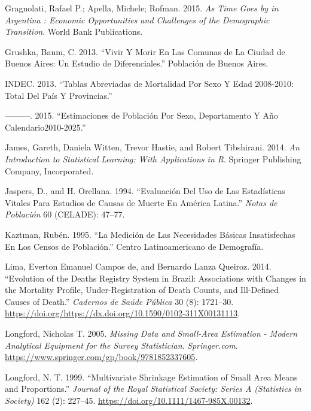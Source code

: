 \documentclass[12pt,]{article}
\begin{document}
\leavevmode\hypertarget{ref-Gragnolati2015}{}%
Gragnolati, Rafael P.; Apella, Michele; Rofman. 2015. \emph{As Time Goes
by in Argentina : Economic Opportunities and Challenges of the
Demographic Transition}. World Bank Publications.

\leavevmode\hypertarget{ref-Grushka2013}{}%
Grushka, Baum, C. 2013. ``Vivir Y Morir En Las Comunas de La Ciudad de
Buenos Aires: Un Estudio de Diferenciales.'' Población de Buenos Aires.

\leavevmode\hypertarget{ref-INDEC2013}{}%
INDEC. 2013. ``Tablas Abreviadas de Mortalidad Por Sexo Y Edad
2008-2010: Total Del País Y Provincias.''

\leavevmode\hypertarget{ref-INDEC2015}{}%
---------. 2015. ``Estimaciones de Población Por Sexo, Departamento Y
Año Calendario2010-2025.''

\leavevmode\hypertarget{ref-James2014}{}%
James, Gareth, Daniela Witten, Trevor Hastie, and Robert Tibshirani.
2014. \emph{An Introduction to Statistical Learning: With Applications
in R}. Springer Publishing Company, Incorporated.

\leavevmode\hypertarget{ref-JaspersOrellana1994}{}%
Jaspers, D., and H. Orellana. 1994. ``Evaluación Del Uso de Las
Estadísticas Vitales Para Estudios de Causas de Muerte En América
Latina.'' \emph{Notas de Población} 60 (CELADE): 47--77.

\leavevmode\hypertarget{ref-Kaztman1995}{}%
Kaztman, Rubén. 1995. ``La Medición de Las Necesidades Básicas
Insatisfechas En Los Censos de Población.'' Centro Latinoamericano de
Demografía.

\leavevmode\hypertarget{ref-LimaQueiroz2014}{}%
Lima, Everton Emanuel Campos de, and Bernardo Lanza Queiroz. 2014.
``Evolution of the Deaths Registry System in Brazil: Associations with
Changes in the Mortality Profile, Under-Registration of Death Counts,
and Ill-Defined Causes of Death.'' \emph{Cadernos de Saúde Pública} 30
(8): 1721--30.
\url{https://doi.org/https://dx.doi.org/10.1590/0102-311X00131113}.

\leavevmode\hypertarget{ref-Longford2005}{}%
Longford, Nicholas T. 2005. \emph{Missing Data and Small-Area Estimation
- Modern Analytical Equipment for the Survey Statistician}.
\emph{Springer.com}.
\url{https://www.springer.com/gp/book/9781852337605}.

\leavevmode\hypertarget{ref-Longford1999}{}%
Longford, N. T. 1999. ``Multivariate Shrinkage Estimation of Small Area
Means and Proportions.'' \emph{Journal of the Royal Statistical Society:
Series A (Statistics in Society)} 162 (2): 227--45.
\url{https://doi.org/10.1111/1467-985X.00132}.
\end{document}

